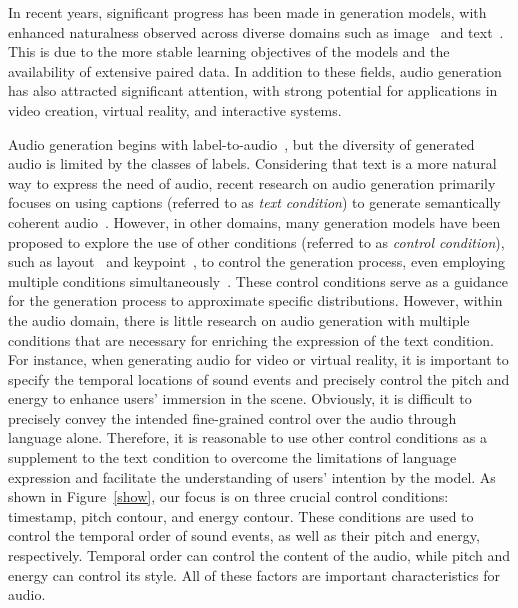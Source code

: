 \documentclass[letterpaper]{article} %
\begin{document}
In recent years, significant progress has been made in generation models, with enhanced naturalness observed across diverse domains such as image~\cite{ramesh2022dalle2,chen2020igpt,nichol2022glide} and text~\cite{radford2020gpt3,schick2023peer,kong2020panns}. This is due to the more stable learning objectives of the models and the availability of extensive paired data. In addition to these fields, audio generation has also attracted significant attention, with strong potential for applications in video creation, virtual reality, and interactive systems.

Audio generation begins with label-to-audio~\cite{fullband2023pascual,csg2021liu}, but the diversity of generated audio is limited by the classes of labels. Considering that text is a more natural way to express the need of audio, recent research on audio generation primarily focuses on using captions (referred to as \textit{text condition}) to generate semantically coherent audio~\cite{yang2022diffsound,kreuk2022audiogen,liu2023audioldm,huang2023makeanaudio,ghosal2023tango}. However, in other domains, many generation models have been proposed to explore the use of other conditions (referred to as  \textit{control condition}), such as layout~\cite{li2021collagingcg} and keypoint~\cite{he2023latentkeypointgan}, to control the generation process, even employing multiple conditions simultaneously~\cite{li2023gligen}. These control conditions serve as a guidance for the generation process to approximate specific distributions. However, within the audio domain, there is little research on audio generation with multiple conditions that are necessary for enriching the expression of the text condition. For instance, when generating audio for video or virtual reality, it is important to specify the temporal locations of sound events and precisely control the pitch and energy to enhance users' immersion in the scene. Obviously, it is difficult to precisely convey the intended fine-grained control over the audio through language alone. Therefore, it is reasonable to use other control conditions as a supplement to the text condition to overcome the limitations of language expression and facilitate the understanding of users' intention by the model. As shown in Figure~\ref{show}, our focus is on three crucial control conditions: timestamp, pitch contour, and energy contour. These conditions are used to control the temporal order of sound events, as well as their pitch and energy, respectively. Temporal order can control the content of the audio, while pitch and energy can control its style. All of these factors are important characteristics for audio. 
\end{document}
